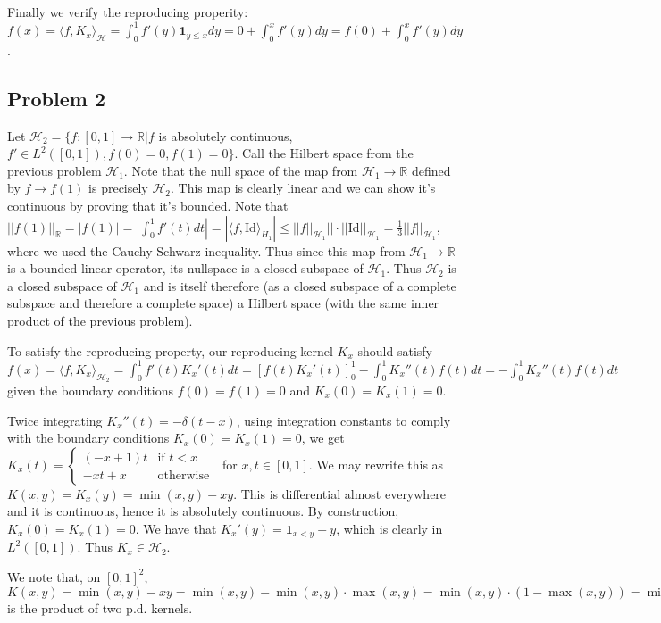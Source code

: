 \documentclass[12pt]{article}
\begin{document}
Finally we verify the reproducing properity: $f(x) = \langle f, K_x \rangle_\mathcal{H} = \int_0^1 f'(y) \mathbf{1}_{y \leq x} dy = 0+ \int_0^x f'(y) dy = f(0) + \int_0^x f'(y) dy$.

\subsection{Problem 2}
Let $\mathcal{H}_2 = \{f: [0,1] \rightarrow \mathbb{R} | f $ is absolutely continuous, $f' \in L^2([0,1]), f(0) = 0, f(1) = 0\}$. Call the Hilbert space from the previous problem $\mathcal{H}_1$. Note that the null space of the map from $\mathcal{H}_1 \rightarrow \mathbb{R}$ defined by $f \rightarrow f(1)$ is precisely $\mathcal{H}_2$. This map is clearly linear and we can show it's continuous by proving that it's bounded. Note that $||f(1)||_\mathbb{R} = |f(1)| = |\int_0^1 f'(t)dt| = |\langle f, \text{Id} \rangle_{H_1} | \leq ||f||_{\mathcal{H}_1}||\cdot ||\text{Id}||_{\mathcal{H}_1} = \frac{1}{3} ||f||_{\mathcal{H}_1}$, where we used the Cauchy-Schwarz inequality. Thus since this map from $\mathcal{H}_1 \rightarrow \mathbb{R}$ is a bounded linear operator, its nullspace is a closed subspace of $\mathcal{H}_1$. Thus $\mathcal{H}_2$ is a closed subspace of $\mathcal{H}_1$ and is itself therefore (as a closed subspace of a complete subspace and therefore a complete space) a Hilbert space (with the same inner product of the previous problem).

To satisfy the reproducing property, our reproducing kernel $K_x$ should satisfy $f(x) = \langle f, K_x \rangle_{\mathcal{H}_2} = \int_0^1 f'(t) K_x'(t) dt = [f(t)K_x'(t)]_0^1 - \int_0^1 K_x''(t)f(t)dt =  - \int_0^1 K_x''(t)f(t)dt$ given the boundary conditions $f(0)=f(1)=0$ and $K_x(0) = K_x(1) =0$.

Twice integrating $K_x''(t) = -\delta(t-x)$, using integration constants to comply with the boundary conditions $K_x(0) = K_x(1) = 0$, we get $K_x(t) = \begin{cases} (-x+1)t  &\mbox{if } t < x \\ 
-xt+x & \mbox{otherwise } \end{cases}$ for $x,t \in [0,1]$. We may rewrite this as $K(x,y) = K_x(y) = \min(x,y) - xy.$ This is differential almost everywhere and it is continuous, hence it is absolutely continuous. By construction, $K_x(0) = K_x(1) = 0$. We have that $K_x'(y) = \mathbf{1}_{x<y} -y$, which is clearly in $L^2([0,1])$. Thus $K_x \in \mathcal{H}_2$. 

We note that, on $[0,1]^2$, $K(x,y) = \min(x,y) - xy = \min(x,y) - \min(x,y)\cdot \max(x,y) = \min(x,y) \cdot (1-\max(x,y)) = \min(x,y) \cdot \min(1-x,1-y)$ is the product of two p.d. kernels.
\end{document}
